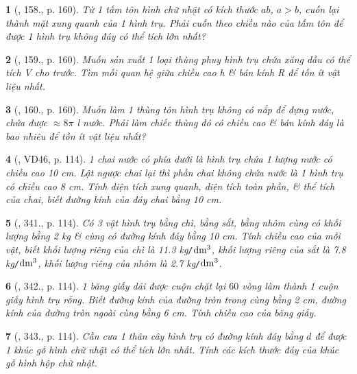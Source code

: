 \documentclass{article}
\newtheorem{baitoan}{}
\begin{document}
\begin{baitoan}[\cite{Tuyen_Toan_9_old}, 158., p. 160]
	Từ 1 tấm tôn hình chữ nhật có kích thước $ab$, $a > b$, cuốn lại thành mặt xung quanh của 1 hình trụ. Phải cuốn theo chiều nào của tấm tôn để được 1 hình trụ không đáy có thể tích lớn nhất?
\end{baitoan}

\begin{baitoan}[\cite{Tuyen_Toan_9_old}, 159., p. 160]
	Muốn sản xuất 1 loại thùng phuy hình trụ chứa xăng dầu có thể tích V cho trước. Tìm mối quan hệ giữa chiều cao h \& bán kính R để tốn ít vật liệu nhất.
\end{baitoan}

\begin{baitoan}[\cite{Tuyen_Toan_9_old}, 160., p. 160]
	Muốn làm 1 thùng tôn hình trụ không có nắp để đựng nước, chứa được $\approx8\pi$ {\rm l} nước. Phải làm chiếc thùng đó có chiều cao \& bán kính đáy là bao nhiêu để tồn ít vật liệu nhất?
\end{baitoan}

\begin{baitoan}[\cite{Binh_Toan_9_tap_2}, VD46, p. 114]
	1 chai nước có phía dưới là hình trụ chứa 1 lượng nước có chiều cao {\rm10 cm}. Lật ngược chai lại thì phần chai không chứa nước là 1 hình trụ có chiều cao {\rm8 cm}. Tính diện tích xung quanh, diện tích toàn phần, \& thể tích của chai, biết đường kính của đáy chai bằng {\rm10 cm}.
\end{baitoan}

\begin{baitoan}[\cite{Binh_Toan_9_tap_2}, 341., p. 114]
	Có 3 vật hình trụ bằng chì, bằng sắt, bằng nhôm cùng có khối lượng bằng {\rm2 kg} \& cùng có đường kính đáy bằng {\rm10 cm}. Tính chiều cao của mỗi vật, biết khối lượng riêng của chì là {\rm11.3 kg{\tt/}$\rm dm^3$}, khối lượng riêng của sắt là {\rm7.8 kg{\tt/}$\rm dm^3$}, khối lượng riêng của nhôm là {\rm2.7 kg{\tt/}$\rm dm^3$}.
\end{baitoan}

\begin{baitoan}[\cite{Binh_Toan_9_tap_2}, 342., p. 114]
	1 băng giấy dải được cuộn chặt lại $60$ vòng làm thành 1 cuộn giấy hình trụ rỗng. Biết đường kính của đường tròn trong cùng bằng {\rm2 cm}, đường kính của đường tròn ngoài cùng bằng {\rm6 cm}. Tính chiều cao của băng giấy.
\end{baitoan}

\begin{baitoan}[\cite{Binh_Toan_9_tap_2}, 343., p. 114]
	Cần cưa 1 thân cây hình trụ có đường kính đáy bằng $d$ để được 1 khúc gỗ hình chữ nhật có thể tích lớn nhất. Tính các kích thước đáy của khúc gỗ hình hộp chữ nhật.
\end{baitoan}
\end{document}
